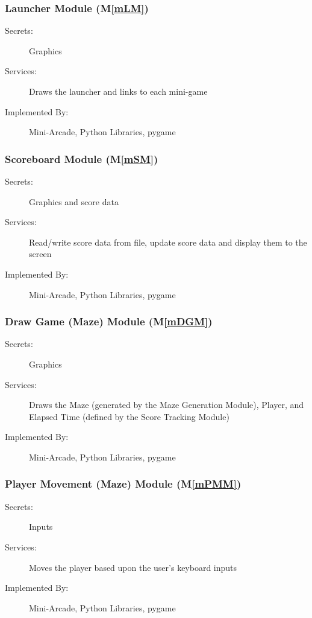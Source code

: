 \documentclass[12pt, titlepage]{article}
\newcommand{\mref}[1]{M\ref{#1}}
\begin{document}
\subsubsection{Launcher Module (\mref{mLM})}
\begin{description}
\item[Secrets:] Graphics
\item[Services:] Draws the launcher and links to each mini-game
\item[Implemented By:] Mini-Arcade, Python Libraries, pygame
\end{description}

\subsubsection{Scoreboard Module (\mref{mSM})}
\begin{description}
\item[Secrets:] Graphics and score data
\item[Services:] Read/write score data from file, update score data and display them to the screen
\item[Implemented By:] Mini-Arcade, Python Libraries, pygame
\end{description}

\subsubsection{Draw Game (Maze) Module (\mref{mDGM})}
\begin{description}
\item[Secrets:] Graphics
\item[Services:] Draws the Maze (generated by the Maze Generation Module), Player, and Elapsed Time (defined by the Score Tracking Module) 
\item[Implemented By:] Mini-Arcade, Python Libraries, pygame
\end{description}

\subsubsection{Player Movement (Maze) Module (\mref{mPMM})}
\begin{description}
\item[Secrets:] Inputs
\item[Services:] Moves the player based upon the user's keyboard inputs
\item[Implemented By:] Mini-Arcade, Python Libraries, pygame
\end{description}
\end{document}
